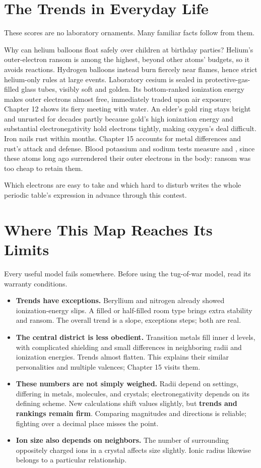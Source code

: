 \section{The Trends in Everyday Life}

These scores are no laboratory ornaments. Many familiar facts follow from them.

Why can helium balloons float safely over children at birthday parties? Helium's outer-electron ransom is among the highest, beyond other atoms' budgets, so it avoids reactions. Hydrogen balloons instead burn fiercely near flames, hence strict helium-only rules at large events. Laboratory cesium is sealed in protective-gas-filled glass tubes, visibly soft and golden. Its bottom-ranked ionization energy makes outer electrons almost free, immediately traded upon air exposure; Chapter 12 shows its fiery meeting with water. An elder's gold ring stays bright and unrusted for decades partly because gold's high ionization energy and substantial electronegativity hold electrons tightly, making oxygen's deal difficult. Iron nails rust within months. Chapter 15 accounts for metal differences and rust's attack and defense. Blood potassium and sodium tests measure  and , since these atoms long ago surrendered their outer electrons in the body: ransom was too cheap to retain them.

Which electrons are easy to take and which hard to disturb writes the whole periodic table's expression in advance through this contest.

\section{Where This Map Reaches Its Limits}

Every useful model fails somewhere. Before using the tug-of-war model, read its warranty conditions.

\begin{itemize}[itemsep=2pt]
\item \textbf{Trends have exceptions.} Beryllium and nitrogen already showed ionization-energy slips. A filled or half-filled room type brings extra stability and ransom. The overall trend is a slope, exceptions steps; both are real.
\item \textbf{The central district is less obedient.} Transition metals fill inner d levels, with complicated shielding and small differences in neighboring radii and ionization energies. Trends almost flatten. This explains their similar personalities and multiple valences; Chapter 15 visits them.
\item \textbf{These numbers are not simply weighed.} Radii depend on settings, differing in metals, molecules, and crystals; electronegativity depends on its defining scheme. New calculations shift values slightly, but \textbf{trends and rankings remain firm}. Comparing magnitudes and directions is reliable; fighting over a decimal place misses the point.
\item \textbf{Ion size also depends on neighbors.} The number of surrounding oppositely charged ions in a crystal affects size slightly. Ionic radius likewise belongs to a particular relationship.
\end{itemize}

